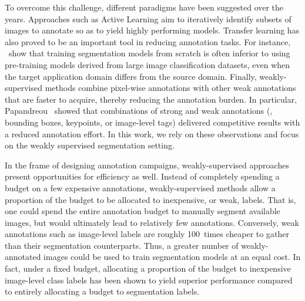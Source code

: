 
To overcome this challenge, different paradigms have been suggested over the years. Approaches such as Active Learning aim to iteratively identify subsets of images to annotate so as to yield highly performing models. Transfer learning has also proved to be an important tool in reducing annotation tasks. For instance, ~show that training segmentation models from scratch is often inferior to using pre-training models derived from large image classification datasets, even when the target application domain differs from the source domain. Finally, weakly-supervised methods combine pixel-wise annotations with other weak annotations that are faster to acquire, thereby reducing the annotation burden. In particular, Papandreou~\etal{} showed that combinations of strong and weak annotations (\eg, bounding boxes, keypoints, or image-level tags) delivered competitive results with a reduced annotation effort. In this work, we rely on these observations and focus on the weakly supervised segmentation setting.


In the frame of designing annotation campaigns, weakly-supervised approaches present opportunities for efficiency as well. Instead of completely spending a budget on a few expensive annotations, weakly-supervised methods allow a proportion of the budget to be allocated to inexpensive, or weak, labels. That is, one could spend the entire annotation budget to manually segment available images, but would ultimately lead to relatively few annotations. Conversely, weak annotations such as image-level labels are roughly 100~times cheaper to gather than their segmentation counterparts. Thus, a greater number of weakly-annotated images could be used to train segmentation models at an equal cost. In fact, under a fixed budget, allocating a proportion of the budget to inexpensive image-level class labels has been shown to yield superior performance compared to entirely allocating a budget to segmentation labels.


